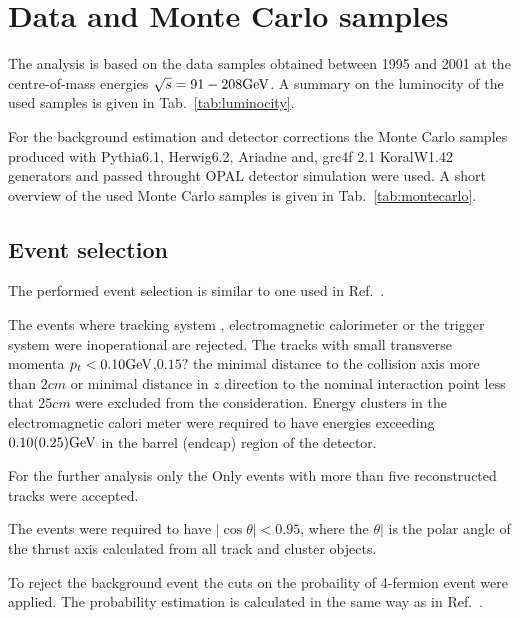 \section{Data and Monte Carlo samples}
\label{sec:selection}
The analysis is based on the data samples obtained between 1995 and 2001 
at the centre-of-mass energies $\sqrt{s}=91-208{\text{Ge}\kern-0.06667em\text{V\/}}$. A summary on the luminocity
of the used samples is given in Tab.~\ref{tab:luminocity}.
\TABluminocity


For the background estimation and detector corrections the Monte Carlo samples 
produced with Pythia6.1, Herwig6.2, Ariadne and, grc4f 2.1  KoralW1.42~\cite{Skrzypek:1995wd} generators 
and passed throught OPAL detector simulation were used.
A short overview of the used Monte Carlo samples is given in Tab.~\ref{tab:montecarlo}.
\TABmontecarlo


\subsection{Event selection}
\label{sec:selection}
The performed event selection is similar to one used in Ref.~\cite{}.

The events where tracking system , electromagnetic calorimeter or the trigger system were inoperational are rejected.
The tracks with small transverse momenta $p_t<0.10{\text{Ge}\kern-0.06667em\text{V\/}}$,{\bf $0.15?$} the minimal  distance to the 
collision axis more than $2cm$ or minimal distance in $z$ direction to the nominal interaction point less that $25cm$
were excluded from the consideration. 
Energy clusters in the electromagnetic calori
meter were required to have energies exceeding $0.10(0.25) {\text{Ge}\kern-0.06667em\text{V\/}}$ in 
the barrel (endcap) region of the detector.


For the further analysis only the
Only events with more than five reconstructed tracks were accepted.

The events were required to have $|\cos\theta|<0.95$, where the  
$\theta|$ is the polar angle of the thrust axis calculated from all track
and cluster objects.

To reject the background event the cuts on the probaility of 4-fermion event were applied.
The probability estimation is  calculated in the same way as in Ref.~\cite{Abbiendi:2000eg}.






